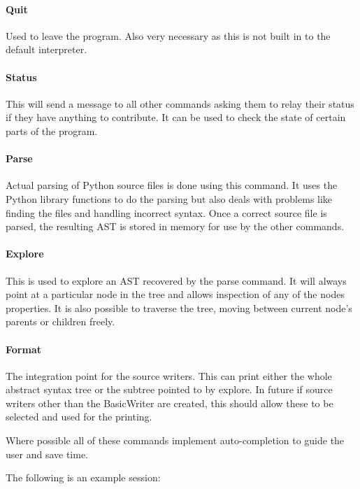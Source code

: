 \documentclass{report}
\begin{document}
\paragraph{Quit}

Used to leave the program. Also very necessary as this is not built in to the default interpreter.

\paragraph{Status}

This will send a message to all other commands asking them to relay their status if they have anything to contribute. It can be
used to check the state of certain parts of the program.

\paragraph{Parse}

Actual parsing of Python source files is done using this command. It uses the Python library functions to do the parsing but also
deals with problems like finding the files and handling incorrect syntax. Once a correct source file is parsed, the resulting AST
is stored in memory for use by the other commands.

\paragraph{Explore}

This is used to explore an AST recovered by the parse command. It will always point at a particular node in the tree and allows
inspection of any of the nodes properties. It is also possible to traverse the tree, moving between current node's parents or
children freely.

\paragraph{Format}

The integration point for the source writers. This can print either the whole abstract syntax tree or the subtree pointed to by
explore. In future if source writers other than the BasicWriter are created, this should allow these to be selected and used for
the printing.

Where possible all of these commands implement auto-completion to guide the user and save time.

The following is an example session:
\end{document}
